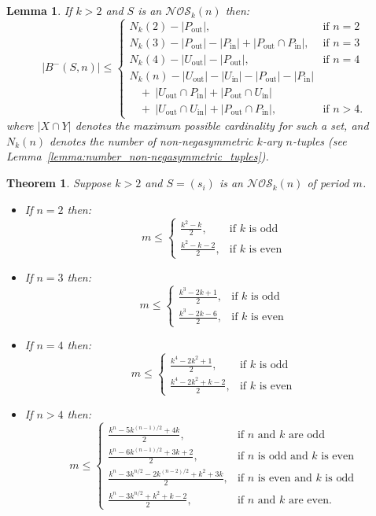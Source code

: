 \documentclass[10pt,a4paper]{amsart}
\newtheorem{lemma}{Lemma}
\newtheorem{theorem}{Theorem}
\begin{document}
\begin{lemma}  \label{lemma:NOS-bounds-high-level}
If $k>2$ and $S$ is an $\mathcal{NOS}_k(n)$ then:
\[ |B^-(S,n)|\leq \begin{cases}
N_k(2) - |P_{\text{out}}|,
 & \text{if $n=2$} \\
N_k(3) - |P_{\text{out}}|-|P_{\text{in}}| + |P_{\text{out}}\cap P_{\text{in}}|,
 & \text{if $n=3$} \\
N_k(4) - |U_{\text{out}}|-|P_{\text{out}}|,
 & \text{if $n=4$} \\
N_k(n) - |U_{\text{out}}|-|U_{\text{in}}|-|P_{\text{out}}|-|P_{\text{in}}| \\
~~~~+~|U_{\text{out}}\cap P_{\text{in}}|+|P_{\text{out}}\cap U_{\text{in}}| \\
~~~~+~|U_{\text{out}}\cap U_{\text{in}}|+|P_{\text{out}}\cap P_{\text{in}}|,
 & \text{if $n>4$.}
\end{cases} \]
where $|X\cap Y|$ denotes the maximum possible cardinality for such a set, and $N_k(n)$ denotes the
number of non-negasymmetric $k$-ary $n$-tuples (see
Lemma~\ref{lemma:number_non-negasymmetric_tuples}).
\end{lemma}

\begin{theorem}  \label{theorem:new_NOS_bounds}
Suppose $k>2$ and $S=(s_i)$ is an $\mathcal{NOS}_k(n)$ of period $m$.
\begin{itemize}
\item[i)] If $n=2$ then:
\[ m \leq \begin{cases}
\frac{k^2-k}{2}, & \text{if $k$ is odd} \\
\frac{k^2-k-2}{2}, & \text{if $k$ is even}
\end{cases} \]
\item[ii)] If $n=3$ then:
\[ m \leq \begin{cases}
\frac{k^3-2k+1}{2}, & \text{if $k$ is odd} \\
\frac{k^3-2k-6}{2}, & \text{if $k$ is even}
\end{cases} \]
\item[iii)] If $n=4$ then:
\[ m \leq \begin{cases}
\frac{k^4-2k^2+1}{2}, & \text{if $k$ is odd} \\
\frac{k^4-2k^2+k-2}{2}, & \text{if $k$ is even}
\end{cases}\]
\item[iv)] If $n>4$ then:
\[ m \leq \begin{cases}
\frac{k^n-5k^{(n-1)/2}+4k}{2}, & \text{if $n$ and $k$ are odd} \\
\frac{k^n-6k^{(n-1)/2}+3k+2}{2}, & \text{if $n$ is odd and $k$ is even} \\
\frac{k^n-3k^{n/2}-2k^{(n-2)/2}+k^2+3k}{2}, & \text{if $n$ is even and $k$ is odd} \\
\frac{k^n-3k^{n/2}+k^2+k-2}{2}, & \text{if $n$ and $k$ are even.}
\end{cases}\]
\end{itemize}
\end{theorem}
\end{document}
